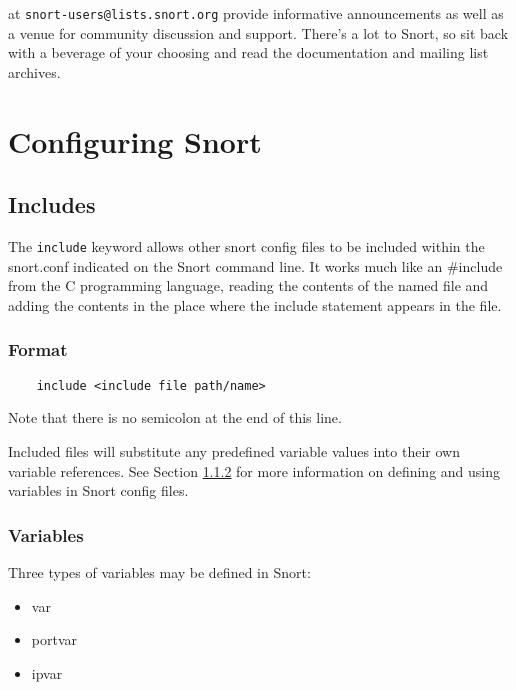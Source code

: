 \documentclass[english]{report}
\newenvironment{note}{
\samepage
    \vspace{10pt}{\textsf{
        {\hspace{7pt}\Huge{$\triangle$\hspace{-12.5pt}{\Large{$^!$}}}}\hspace{5pt}
        {\Large{NOTE}}
    }
    }
   \begin{center}
    \par\vspace{-17pt}

    \begin{lrbox}{\savepar}
    \begin{minipage}[r]{6in}
}
{
    \end{minipage}
    \end{lrbox}
    \fbox{
        \usebox{
            \savepar
	}
    }
    \par\vskip10pt
    \end{center}
}
\newenvironment{note}{
        \begin{rawhtml}
        <p><table border="1"><tr><td><b>
        Note:&nbsp;&nbsp;</b>
        \end{rawhtml}
}{
        \begin{rawhtml}
        </b></td></tr></table></p>
        \end{rawhtml}
}
\begin{document}
at \verb?snort-users@lists.snort.org? provide informative announcements
as well as a venue for community discussion and support. There's a lot to
Snort, so sit back with a beverage of your choosing and read the documentation
and mailing list archives.

\chapter{Configuring Snort}
\label{Configuring Snort}

\section{Includes}

The {\tt include} keyword allows other snort config files to be included within the
snort.conf indicated on the Snort command line. It works much like an \#include
from the C programming language, reading the contents of the named file and
adding the contents in the place where the include statement appears in the
file.

\subsection{Format}
\begin{verbatim}
    include <include file path/name>
\end{verbatim}

\begin{note}

Note that there is no semicolon at the end of this line. 

\end{note}

Included files will substitute any predefined variable values into their own
variable references.  See Section \ref{variables} for more information on
defining and using variables in Snort config files.

\subsection{Variables}
\label{variables}

Three types of variables may be defined in Snort:

\begin{itemize}
\item var
\item portvar
\item ipvar
\end{itemize}
\end{document}
